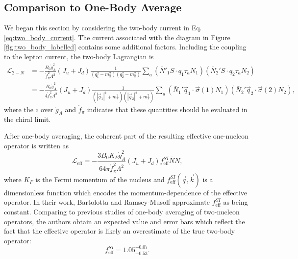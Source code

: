 \documentclass{book}[letterpaper,12pt]
\begin{document}
\subsection{Comparison to One-Body Average}
We began this section by considering the two-body current in Eq. \ref{eq:two_body_current}. The current associated with the diagram in Figure \ref{fig:two_body_labelled} contains some additional factors. Including the coupling to the lepton current, the two-body Lagrangian is
\begin{equation}
\begin{split}
\mathcal{L}_{2-N}&=-\frac{B_0 \mathring{g}_A^2}{\mathring{f}_{\pi}^2\Lambda^2}\left(J_u+J_d\right)\frac{1}{\left(q_1^2-m_{\pi}^2\right)\left(q_2^2-m_{\pi}^2\right)}\sum_a\left(\bar{N}'_1 S\cdot q_1\tau_a N_1\right)\left(\bar{N}_2' S\cdot q_2 \tau_a N_2\right)\\
&=-\frac{B_0\mathring{g}_A^2}{4\mathring{f}_{\pi}^2\Lambda^2}\left(J_u+J_d\right)\frac{1}{\left(|\vec{q}_1|^2+m_{\pi}^2\right)\left(|\vec{q}_2|^2+m_{\pi}^2\right)}\sum_a \left(\bar{N}_1' \vec{q}_1\cdot\vec{\sigma}(1) N_1 \right)\left(\bar{N}_2' \vec{q}_2\cdot\vec{\sigma}(2) N_2\right),
\end{split}
\end{equation}
where the $\circ$ over $\mathring{g}_A$ and $\mathring{f}_{\pi}$ indicates that these quantities should be evaluated in the chiral limit.

After one-body averaging, the coherent part of the resulting effective one-nucleon operator is written as
\begin{equation}
\mathcal{L}_\mathrm{eff}=-\frac{3B_0K_F \mathring{g}_A^2}{64\pi \mathring{f}_{\pi}^2\Lambda^2}\left(J_u+J_d\right)f_\mathrm{eff}^{SI}\bar{N}N,
\end{equation}
where $K_F$ is the Fermi momentum of the nucleus and $f_\mathrm{eff}^{SI}(\vec{q},\vec{k})$ is a dimensionless function which encodes the momentum-dependence of the effective operator. In their work, Bartolotta and Ramsey-Musolf approximate $f_\mathrm{eff}^{SI}$ as being constant. Comparing to previous studies of one-body averaging of two-nucleon operators, the authors obtain an expected value and error bars which reflect the fact that the effective operator is likely an overestimate of the true two-body operator:
\begin{equation}
f_\mathrm{eff}^{SI}=1.05^{+0.07}_{-0.53}.
\end{equation}
\end{document}
